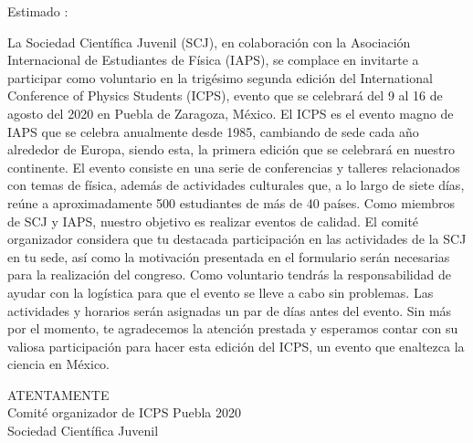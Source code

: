 \documentclass[letterpaper,12pt]{article}
\begin{document}
\BgThispage

Estimado \firstName \hspace{3pt}\lastName:\\ \vspace{15pt}



La Sociedad Científica Juvenil (SCJ), en colaboración con la Asociación Internacional de
Estudiantes de Física (IAPS), se complace en invitarte a participar como voluntario en la
trigésimo segunda edición del International Conference of Physics Students (ICPS),
evento que se celebrará del 9 al 16 de agosto del 2020 en Puebla de Zaragoza, México.
El ICPS es el evento magno de IAPS que se celebra anualmente desde 1985, cambiando
de sede cada año alrededor de Europa, siendo esta, la primera edición que se celebrará
en nuestro continente. El evento consiste en una serie de conferencias y talleres
relacionados con temas de física, además de actividades culturales que, a lo largo de
siete días, reúne a aproximadamente 500 estudiantes de más de 40 países.
Como miembros de SCJ y IAPS, nuestro objetivo es realizar eventos de calidad. El
comité organizador considera que tu destacada participación en las actividades de la
SCJ en tu sede, así como la motivación presentada en el formulario serán necesarias
para la realización del congreso. Como voluntario tendrás la responsabilidad de ayudar
con la logística para que el evento se lleve a cabo sin problemas. Las actividades y
horarios serán asignadas un par de días antes del evento.
Sin más por el momento, te agradecemos la atención prestada y esperamos contar con
su valiosa participación para hacer esta edición del ICPS, un evento que enaltezca la
ciencia en México.

\begin{center}
ATENTAMENTE \\ \vspace{10pt}
Comité organizador de ICPS Puebla 2020 \\ 
Sociedad Científica Juvenil \\
\end{center}
\end{document}
